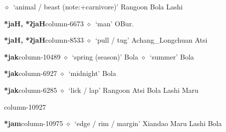          $\diamond$~`animal / beast (note:+carnivore)'
         Rangoon 
\hspace{1ex}
         Bola 
\hspace{1ex}
         Lashi 
  \item {\footnotesize \textbf{*jaH, *ʔjaH}}{\tiny column-6673}
         $\diamond$~`man'
         OBur. 
  \item {\footnotesize \textbf{*jaH, *ʔjaH}}{\tiny column-8533}
         $\diamond$~`pull / tug'
         Achang\_Longchuan 
\hspace{1ex}
         Atsi 
  \item {\footnotesize \textbf{*jak}}{\tiny column-10489}
         $\diamond$~`spring (season)'
         Bola 
\hspace{1ex}
         $\diamond$~`summer'
         Bola 
  \item {\footnotesize \textbf{*jak}}{\tiny column-6927}
         $\diamond$~`midnight'
         Bola 
  \item {\footnotesize \textbf{*jak}}{\tiny column-6285}
         $\diamond$~`lick / lap'
         Rangoon 
\hspace{1ex}
         Atsi 
\hspace{1ex}
         Bola 
\hspace{1ex}
         Lashi 
\hspace{1ex}
         Maru 
  \item {\footnotesize \textbf{}}{\tiny column-10927}
  \item {\footnotesize \textbf{*jam}}{\tiny column-10975}
         $\diamond$~`edge / rim / margin'
         Xiandao 
\hspace{1ex}
         Maru 
\hspace{1ex}
         Lashi 
\hspace{1ex}
         Bola 
\hspace{1ex}
